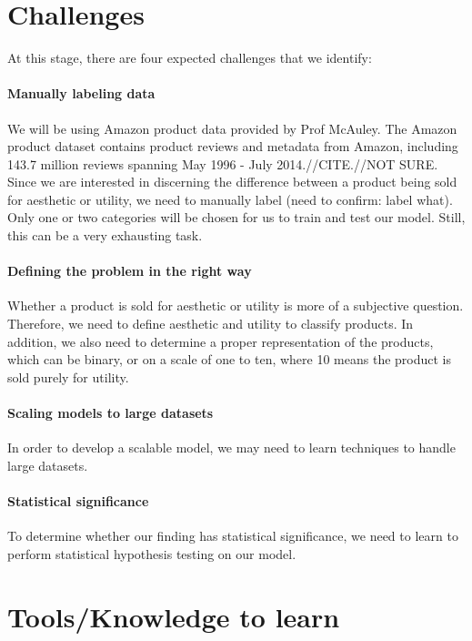 \documentclass[dvips,12pt]{article}
\begin{document}
\section{Challenges}

At this stage, there are four expected challenges that we identify:

\paragraph{Manually labeling data}
We will be using Amazon product data provided by Prof McAuley. The Amazon product dataset contains product reviews and metadata from Amazon, including 143.7 million reviews spanning May 1996 - July 2014.//CITE.//NOT SURE. Since we are interested in discerning the difference between a product being sold for aesthetic or utility, we need to manually label (need to confirm: label what). Only one or two categories will be chosen for us to train and test our model. Still, this can be a very exhausting task. 

\paragraph{Defining the problem in the right way}
Whether a product is sold for aesthetic or utility is more of a subjective question. Therefore, we need to define aesthetic and utility to classify products. In addition, we also need to determine a proper representation of the products, which can be binary, or on a scale of one to ten, where 10 means the product is sold purely for utility.

\paragraph{Scaling models to large datasets}
In order to develop a scalable model, we may need to learn techniques to handle large datasets.

\paragraph{Statistical significance}
To determine whether our finding has statistical significance, we need to learn to perform statistical hypothesis testing on our model.

\section{Tools/Knowledge to learn}
\end{document}
